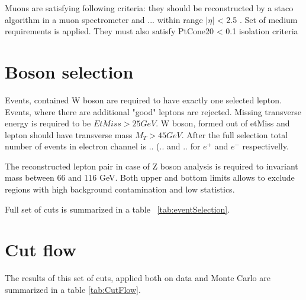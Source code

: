 Muons are satisfying following criteria: they should be reconstructed by a staco algorithm in a muon spectrometer and ... within range $|\eta|$ < 2.5 . Set of medium requirements is applied. They must also satisfy PtCone20 < 0.1 isolation criteria

\section{Boson selection}
Events, contained W boson are required to have exactly one selected lepton. Events, where there are additional "good" leptons are rejected. Missing transverse energy is required to be $EtMiss>25 GeV$.  W boson, formed out of etMiss and lepton should have transverse mass $M_T > 45 GeV$. After the full selection total number of events in electron channel is .. (.. and .. for $e^+$ and $e^-$ respectivelly. 

The reconstructed lepton pair in case of Z boson analysis is required to invariant mass between 66 and 116 GeV. Both upper and bottom limits allows to exclude regions with high background contamination and low statistics. 

Full set of cuts is summarized in a table ~\ref{tab:eventSelection}.
\section{Cut flow}
The results of this set of cuts, applied both on data and Monte Carlo are summarized in a table \ref{tab:CutFlow}. 



